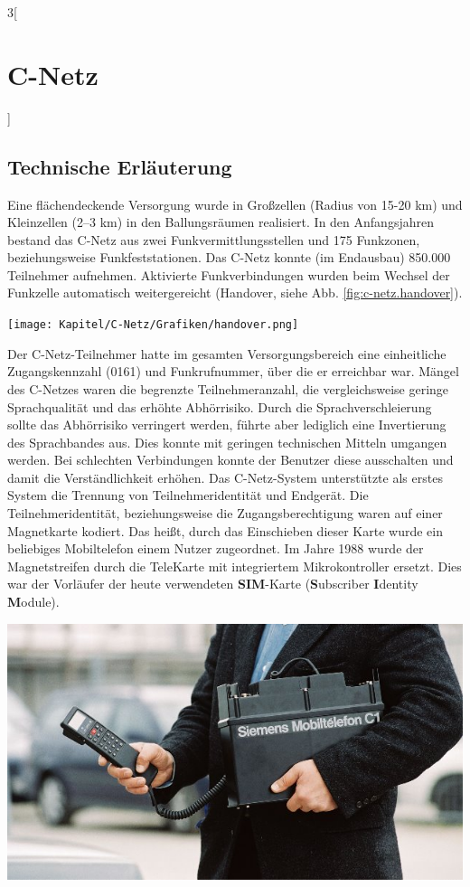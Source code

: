 \begin{multicols}{3}[\section{C-Netz}]
\subsection*{Technische Erläuterung}
Eine flächendeckende Versorgung wurde in Großzellen (Radius von 15-20 km) und Kleinzellen (2–3 km) in den Ballungsräumen realisiert. In den Anfangsjahren bestand das C-Netz aus zwei Funkvermittlungsstellen und 175 Funkzonen, beziehungsweise Funkfeststationen. Das C-Netz konnte (im Endausbau) 850.000 Teilnehmer aufnehmen. Aktivierte Funkverbindungen wurden beim Wechsel der Funkzelle automatisch weitergereicht (Handover, siehe Abb. \ref{fig:c-netz.handover}). 
\begin{Figure}
\texttt{[image: Kapitel/C-Netz/Grafiken/handover.png]}
\label{fig:c-netz.handover}
\end{Figure}
Der C-Netz-Teilnehmer hatte im gesamten Versorgungsbereich eine einheitliche Zugangskennzahl (0161) und Funkrufnummer, über die er erreichbar war. Mängel des C-Netzes waren die begrenzte Teilnehmeranzahl, die vergleichsweise geringe Sprachqualität und das erhöhte Abhörrisiko. Durch die Sprachverschleierung sollte das Abhörrisiko verringert werden, führte aber lediglich eine Invertierung des Sprachbandes aus. Dies konnte mit geringen technischen Mitteln umgangen werden. Bei schlechten Verbindungen konnte der Benutzer diese ausschalten und damit die Verständlichkeit erhöhen.
Das C-Netz-System unterstützte als erstes System die Trennung von Teilnehmeridentität und Endgerät. Die Teilnehmeridentität, beziehungsweise die Zugangsberechtigung waren auf einer Magnetkarte kodiert. Das heißt, durch das Einschieben dieser Karte wurde ein beliebiges Mobiltelefon einem Nutzer zugeordnet. Im Jahre 1988 wurde der Magnetstreifen durch die TeleKarte mit integriertem Mikrokontroller ersetzt. Dies war der Vorläufer der heute verwendeten \textbf{SIM}-Karte (\textbf{S}ubscriber \textbf{I}dentity \textbf{M}odule).
\begin{Figure}
\includegraphics[width=\linewidth]{Kapitel/C-Netz/Grafiken/MobiltelefonC1.jpg}

\end{Figure}
\end{multicols}
